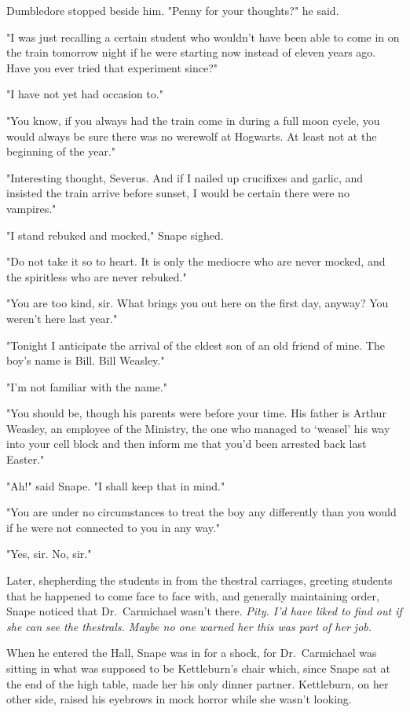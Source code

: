 Dumbledore stopped beside him. "Penny for your thoughts?" he said.

"I was just recalling a certain student who wouldn't have been able to come in on the train tomorrow night if he were starting now instead of eleven years ago. Have you ever tried that experiment since?"

"I have not yet had occasion to."

"You know, if you always had the train come in during a full moon cycle, you would always be sure there was no werewolf at Hogwarts. At least not at the beginning of the year."

"Interesting thought, Severus. And if I nailed up crucifixes and garlic, and insisted the train arrive before sunset, I would be certain there were no vampires."

"I stand rebuked and mocked," Snape sighed.

"Do not take it so to heart. It is only the mediocre who are never mocked, and the spiritless who are never rebuked."

"You are too kind, sir. What brings you out here on the first day, anyway? You weren't here last year."

"Tonight I anticipate the arrival of the eldest son of an old friend of mine. The boy's name is Bill. Bill Weasley."

"I'm not familiar with the name."

"You should be, though his parents were before your time. His father is Arthur Weasley, an employee of the Ministry, the one who managed to `weasel' his way into your cell block and then inform me that you'd been arrested back last Easter."

"Ah!" said Snape. "I shall keep that in mind."

"You are under no circumstances to treat the boy any differently than you would if he were not connected to you in any way."

"Yes, sir. No, sir."

Later, shepherding the students in from the thestral carriages, greeting students that he happened to come face to face with, and generally maintaining order, Snape noticed that Dr.~Carmichael wasn't there. \emph{Pity. I'd have liked to find out if she can see the thestrals. Maybe no one warned her this was part of her job.}

When he entered the Hall, Snape was in for a shock, for Dr.~Carmichael was sitting in what was supposed to be Kettleburn's chair which, since Snape sat at the end of the high table, made her his only dinner partner. Kettleburn, on her other side, raised his eyebrows in mock horror while she wasn't looking.

